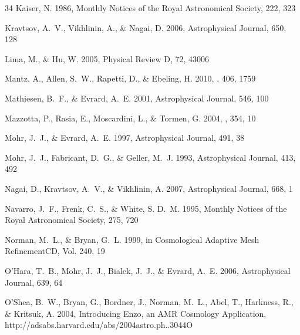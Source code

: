 \documentclass[12pt,preprint]{aastex}
\begin{document}
\begin{thebibliography}{34}
Kaiser, N. 1986, Monthly Notices of the Royal Astronomical Society, 222, 323

Kravtsov, A.~V., Vikhlinin, A., \& Nagai, D. 2006, Astrophysical Journal, 650,
  128

Lima, M., \& Hu, W. 2005, Physical Review D, 72, 43006

{Mantz}, A., {Allen}, S.~W., {Rapetti}, D., \& {Ebeling}, H. 2010, \mnras, 406,
  1759

Mathiesen, B.~F., \& Evrard, A.~E. 2001, Astrophysical Journal, 546, 100

{Mazzotta}, P., {Rasia}, E., {Moscardini}, L., \& {Tormen}, G. 2004, \mnras,
  354, 10

Mohr, J.~J., \& Evrard, A.~E. 1997, Astrophysical Journal, 491, 38

Mohr, J.~J., Fabricant, D.~G., \& Geller, M.~J. 1993, Astrophysical Journal,
  413, 492

Nagai, D., Kravtsov, A.~V., \& Vikhlinin, A. 2007, Astrophysical Journal, 668,
  1

Navarro, J.~F., Frenk, C.~S., \& White, S. D.~M. 1995, Monthly Notices of the
  Royal Astronomical Society, 275, 720

Norman, M.~L., \& Bryan, G.~L. 1999, in Cosmological Adaptive Mesh
  {RefinementCD}, Vol. 240, 19

{O'Hara}, T.~B., Mohr, J.~J., Bialek, J.~J., \& Evrard, A.~E. 2006,
  Astrophysical Journal, 639, 64

{O'Shea}, B.~W., Bryan, G., Bordner, J., Norman, M.~L., Abel, T., Harkness, R.,
  \& Kritsuk, A. 2004, Introducing Enzo, an {AMR} Cosmology Application,
  {http://adsabs.harvard.edu/abs/2004astro.ph..3044O}


\end{thebibliography}
\end{document}
